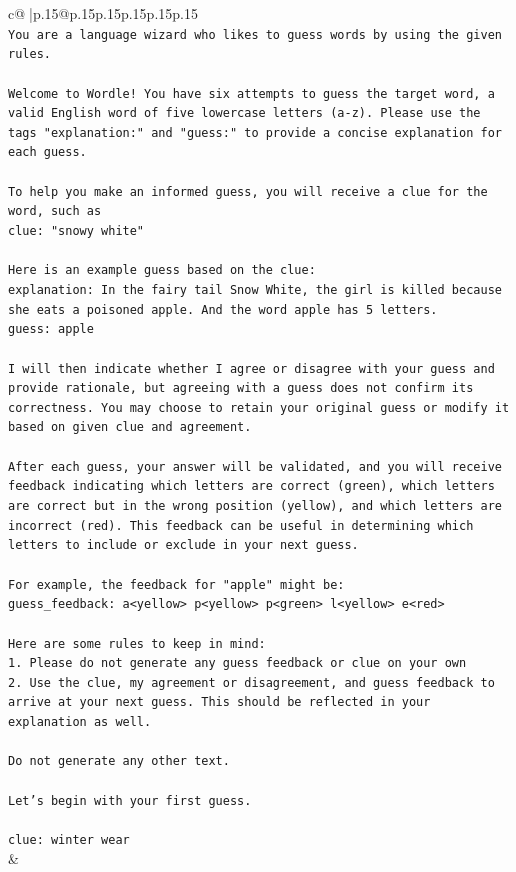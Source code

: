 \documentclass{article}
\begin{document}
{\begin{supertabular}{c@{$\;$}|p{.15\linewidth}@{}p{.15\linewidth}p{.15\linewidth}p{.15\linewidth}p{.15\linewidth}p{.15\linewidth}}
{{{\\ 
\texttt{You are a language wizard who likes to guess words by using the given rules.} \\
\\ 
\texttt{Welcome to Wordle! You have six attempts to guess the target word, a valid English word of five lowercase letters (a{-}z). Please use the tags "explanation:" and "guess:" to provide a concise explanation for each guess.} \\
\\ 
\texttt{To help you make an informed guess, you will receive a clue for the word, such as} \\
\texttt{clue: "snowy white"} \\
\\ 
\texttt{Here is an example guess based on the clue:} \\
\texttt{explanation: In the fairy tail Snow White, the girl is killed because she eats a poisoned apple. And the word apple has 5 letters.} \\
\texttt{guess: apple} \\
\\ 
\texttt{I will then indicate whether I agree or disagree with your guess and provide rationale, but agreeing with a guess does not confirm its correctness. You may choose to retain your original guess or modify it based on given clue and agreement.} \\
\\ 
\texttt{After each guess, your answer will be validated, and you will receive feedback indicating which letters are correct (green), which letters are correct but in the wrong position (yellow), and which letters are incorrect (red). This feedback can be useful in determining which letters to include or exclude in your next guess.} \\
\\ 
\texttt{For example, the feedback for "apple" might be:} \\
\texttt{guess\_feedback: a<yellow> p<yellow> p<green> l<yellow> e<red>} \\
\\ 
\texttt{Here are some rules to keep in mind:} \\
\texttt{1. Please do not generate any guess feedback or clue on your own} \\
\texttt{2. Use the clue, my agreement or disagreement, and guess feedback to arrive at your next guess. This should be reflected in your explanation as well.} \\
\\ 
\texttt{Do not generate any other text.} \\
\\ 
\texttt{Let's begin with your first guess.} \\
\\ 
\texttt{clue: winter wear} \\
            }
        }
    }
    & \\ \\


\end{supertabular}}
\end{document}
